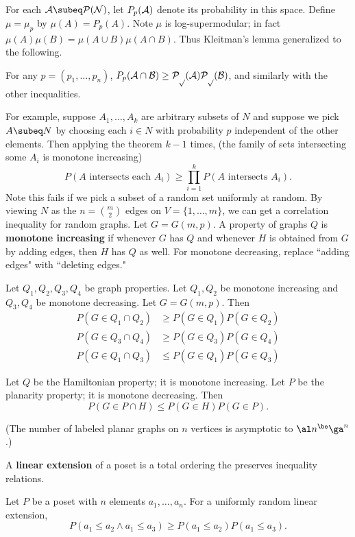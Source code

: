 For each $\cal A\subeq P(N)$, let $P_p(\cal A)$ denote its probability in this space. %
Define $\mu=\mu_p$ by $\mu(A)=P_p(A)$. Note $\mu$ is log-supermodular; in fact $\mu(A)\mu(B)=\mu(A\cup B)\mu(A\cap B)$. Thus Kleitman's lemma generalized to the following. 
\begin{thm}
For any $p=(p_1,\ldots, p_n)$, $P_p(\cal A\cap \cal B)\ge P_p(\cal A)P_p(\cal B)$, and similarly with the other inequalities.
\end{thm}
For example, suppose $A_1,\ldots, A_k$ are arbitrary subsets of $N$ and suppose we pick $A\subeq N$ by choosing each $i\in N$ with probability $p$ independent of the other elements. Then applying the theorem $k-1$ times, (the family of sets intersecting some $A_i$ is monotone increasing)
\[
P(A\text{ intersects each }A_i)\ge \prod_{i=1}^k P(A\text{ intersects }A_i).
\]
Note this fails if we pick a subset of a random set uniformly at random. %
By viewing $N$ as the $n=\binom m2$ edges on $V=\{1,\ldots, m\}$, we can get a correlation inequality for random graphs. Let $G=G(m,p)$. 
A property of graphs $Q$ is \textbf{monotone increasing} if whenever $G$ has $Q$ and whenever $H$ is obtained from $G$ by adding edges, then $H$ has $Q$ as well. For monotone decreasing, replace ``adding edges" with ``deleting edges."
\begin{thm}
Let $Q_1,Q_2,Q_3,Q_4$ be graph properties. Let $Q_1,Q_2$ be monotone increasing and $Q_3,Q_4$ be monotone decreasing. Let $G=G(m,p)$. Then
\begin{align*}
P(G\in Q_1\cap Q_2)&\ge P(G\in Q_1)P(G\in Q_2)\\
P(G\in Q_3\cap Q_4)&\ge P(G\in Q_3)P(G\in Q_4)\\
P(G\in Q_1\cap Q_3)&\le P(G\in Q_1)P(G\in Q_3)
\end{align*}
\end{thm}
\begin{ex}
Let $Q$ be the Hamiltonian property; it is monotone increasing. Let $P$ be the planarity property; it is monotone decreasing. Then
\[
P(G\in P\cap H)\le P(G\in H)P(G\in P).
\]
\end{ex}
(The number of labeled planar graphs on $n$ vertices is asymptotic to $\al n^{\be}\ga^n$.) %
\begin{df}
A \textbf{linear extension} of a poset is a total ordering the preserves inequality relations.
\end{df}
\begin{thm}
Let $P$ be a poset with $n$ elements $a_1,\ldots, a_n$. For a uniformly random linear extension,
\[
P(a_1\le a_2\wedge a_1\le a_3)\ge P(a_1\le a_2)P(a_1\le a_3).
\]
\end{thm}
